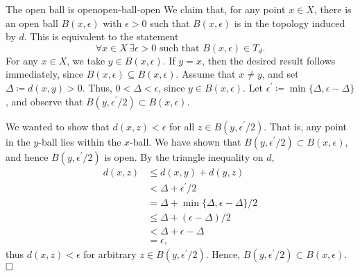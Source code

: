 \documentclass{article}
\renewcommand*\qedsymbol{\hfill\ensuremath{\Box}}
\numberwithin{equation}{section}
\numberwithin{enumi}{section}
\begin{document}
\begin{theorem}{The open ball is open}{open-ball-open}
    We claim that, for any point $ x \in X $, there is an open ball $ B(x,
    \epsilon) $ with $ \epsilon > 0 $ such that $ B(x, \epsilon) $ is in the
    topology induced by $ d $. This is equivalent to the statement
    \begin{equation}
        \forall x \in X\, \exists \epsilon > 0 \text{ such that }
            B(x, \epsilon) \in T_d.
    \end{equation}
    For any $ x \in X $, we take $ y \in B(x, \epsilon) $. If $ y=x $, then the
    desired result follows immediately, since $ B(x, \epsilon) \subseteq B(x,
    \epsilon) $. Assume that $ x \neq y $, and set $ \Delta \coloneq d(x, y) > 0
    $. Thus, $ 0 < \Delta < \epsilon $, since $ y \in B(x, \epsilon) $. Let $
    \epsilon^\prime \coloneq \min\{\Delta, \epsilon-\Delta\} $, and observe that
    $ B(y, \epsilon^\prime/2) \subset B(x, \epsilon) $.

    We wanted to show that $ d(x, z) < \epsilon $ for all $ z \in B(y,
    \epsilon^\prime/2) $. That is, any point in the $ y $-ball lies within the
    $ x $-ball. We have shown that $ B(y, \epsilon^\prime/2) \subset B(x,
    \epsilon) $, and hence $ B(y, \epsilon^\prime/2) $ is open. By the triangle
    inequality on $ d $,
    \begin{align}
        d(x, z) &\leq d(x, y) + d(y, z) \\
        &< \Delta + \epsilon^\prime/2 \\
        &= \Delta + \min\{ \Delta, \epsilon - \Delta \}/2 \\
        &\leq \Delta + (\epsilon-\Delta)/2 \\
        &< \Delta + \epsilon - \Delta \\
        &= \epsilon,
    \end{align}
    thus $ d(x, z) < \epsilon $ for arbitrary $ z \in B(y, \epsilon^\prime/2) $.
    Hence, $ B(y, \epsilon^\prime/2) \subset B(x, \epsilon) $. $ \qedsymbol $
\end{theorem}
\end{document}
